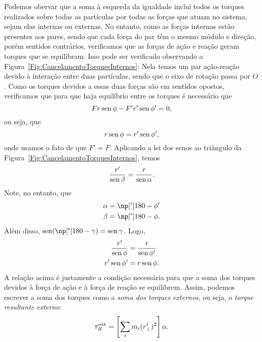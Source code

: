 Podemos obervar que a soma à esquerda da igualdade inclui todos os torques realizados sobre todas as partículas por todas as forças que atuam no sistema, sejam elas internas ou externas. No entanto, como as forças internas estão presentes aos pares, sendo que cada força do par têm o mesmo módulo e direção, porém sentidos contrários, verificamos que as forças de ação e reação geram torques que se equilibram. Isso pode ser verificado observando a Figura~\ref{Fig:CancelamentoTorquesInternos}: Nela temos um par ação-reação devido à interação entre duas partículas, sendo que o eixo de rotação passa por $O$. Como os torques devidos a essas duas forças são em sentidos opostos, verificamos que para que haja equilíbrio entre os torques é necessário que
\begin{equation}
    Fr\operatorname{sen}\phi - F'r'\operatorname{sen}\phi' = 0,
\end{equation}
%
ou seja, que
\begin{equation}
    r\operatorname{sen}\phi = r'\operatorname{sen}\phi',
\end{equation}
%
\noindent{}onde usamos o fato de que $F' = F$. Aplicando a lei dos senos ao triângulo da Figura~\ref{Fig:CancelamentoTorquesInternos}, temos
\begin{equation}
    \frac{r'}{\operatorname{sen}\beta} = \frac{r}{\operatorname{sen}\alpha}.
\end{equation}
%
Note, no entanto, que
\begin{align}
    \alpha &= \degree{180} - \phi' \\
    \beta &= \degree{180} - \phi.
\end{align}
%
Além disso, $\sen (\degree{180} - \gamma) = \sen\gamma$. Logo,
\begin{align}
    \frac{r'}{\operatorname{sen}\phi} &= \frac{r}{\operatorname{sen}\phi'} \\
    r'\operatorname{sen}\phi' &= r\operatorname{sen}\phi.
\end{align}
%
A relação acima é justamente a condição necessária para que a soma dos torques devidos à força de ação e à força de reação se equilibrem. Assim, podemos escrever a soma dos torques como a \emph{soma dos torques externos}, ou seja, o \emph{torque resultante externo}:
\begin{equation}\label{Eq:ProtoSegundaLeiRotacoes}
    \tau_R^{\rm{ext}} = \left[\sum_{i} m_i (r_\perp^i)^2\right] \alpha.
\end{equation}
% 

